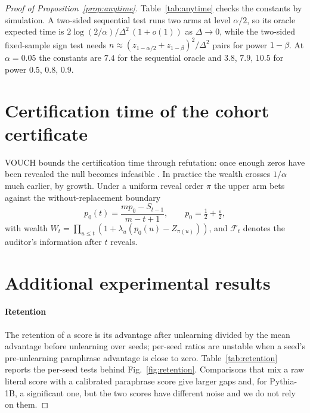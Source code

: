 \documentclass[journal]{IEEEtran}
\theoremstyle{definition}
\theoremstyle{remark}
\newcommand{\F}{\mathcal{F}}
\newcommand{\eps}{\varepsilon}
\begin{document}
\begin{proof}[Proof of Proposition~\ref{prop:anytime}]



Table~\ref{tab:anytime} checks the constants by simulation. A two-sided sequential test runs
two arms at level $\alpha/2$, so its oracle expected time is $2\log(2/\alpha)/\Delta^2\,(1+o(1))$
as $\Delta\to0$, while the two-sided fixed-sample sign test needs
$n\approx(z_{1-\alpha/2}+z_{1-\beta})^2/\Delta^2$ pairs for power $1-\beta$. At $\alpha=0.05$
the constants are $7.4$ for the sequential oracle and $3.8$, $7.9$, $10.5$ for power $0.5$,
$0.8$, $0.9$.



\section{Certification time of the cohort certificate}\label{sec:s-time}

VOUCH bounds the certification time through refutation: once enough zeros have been revealed
the null becomes infeasible \citep{dang2026vouch}. In practice the wealth crosses $1/\alpha$
much earlier, by growth. Under a uniform reveal order $\pi$ the upper arm bets against the
without-replacement boundary
\begin{equation}\label{eq:worboundary}
p_0(t)=\frac{mp_0-S_{t-1}}{m-t+1},\qquad p_0=\tfrac12+\tfrac\eps2,
\end{equation}
with wealth $W_t=\prod_{u\le t}(1+\lambda_u(p_0(u)-Z_{\pi(u)}))$, and $\F_t$ denotes the
auditor's information after $t$ reveals.




\section{Additional experimental results}\label{sec:s-results}




\paragraph{Retention} The retention of a score is its advantage after unlearning divided by the
mean advantage before unlearning over seeds; per-seed ratios are unstable when a seed's
pre-unlearning paraphrase advantage is close to zero. Table~\ref{tab:retention} reports the
per-seed tests behind Fig.~\ref{fig:retention}. Comparisons that mix a raw literal score with
a calibrated paraphrase score give larger gaps and, for Pythia-1B, a significant one, but the
two scores have different noise and we do not rely on them.


\end{proof}
\end{document}
